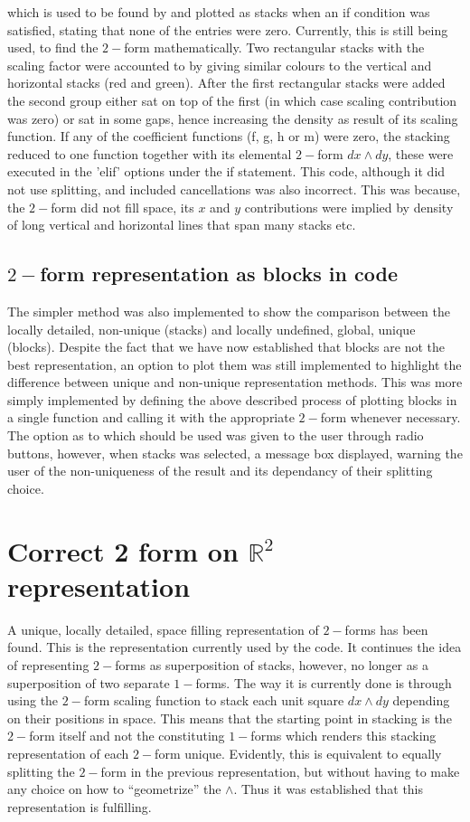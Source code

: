 \documentclass[12pt]{report}
\begin{document}
which is used to be found by and plotted as stacks when an if condition was satisfied, stating that none of the entries were zero. Currently, this is still being used, to find the $2 -$form mathematically.
Two rectangular stacks with the scaling factor were accounted to by giving similar colours to the vertical  and horizontal stacks (red and green). After the first rectangular stacks were added the second group either sat on top of the first (in which case scaling contribution was zero) or sat in some gaps, hence increasing the density as result of its scaling function.
If any of the coefficient functions (f, g, h or m) were zero, the stacking reduced to one function together with its elemental $2-$form $dx\wedge dy$, these were executed in the 'elif' options under the if statement. This code, although it did not use splitting, and included cancellations was also incorrect. This was because, the $2-$form did not fill space, its $x$ and $y$ contributions were implied by density of long vertical and horizontal lines that span many stacks etc.


\subsection{$2-$form representation as blocks in code}
The simpler method was also implemented to show the comparison between the locally detailed, non-unique (stacks) and locally undefined, global, unique (blocks). Despite the fact that we have now established that blocks are not the best representation, an option to plot them was still implemented to highlight the difference between unique and non-unique representation methods. 
This was more simply implemented by defining the above described process of plotting blocks in a single function and calling it with the appropriate $2-$form whenever necessary.
The option as to which should be used was given to the user through radio buttons, however, when stacks was selected, a message box displayed, warning the user of the non-uniqueness of the result and its dependancy of their splitting choice.

\section{Correct 2 form on $\mathbb{R}^{2}$ representation}
A unique, locally detailed, space filling representation of $2-$forms has been found. This is the representation currently used by the code. It continues the idea of representing $2-$forms as superposition of stacks, however, no longer as a superposition of two separate $1-$forms. The way it is currently done is through using the $2-$form scaling function to stack each unit square $dx\wedge dy$ depending on their positions in space. This means that the starting point in stacking is the $2-$form itself and not the constituting $1-$forms which renders this stacking representation of each $2-$form unique. Evidently, this is equivalent to equally splitting the $2-$form in the previous representation, but without having to make any choice on how to ``geometrize'' the $\wedge$. Thus it was established that this representation is fulfilling.
\end{document}

